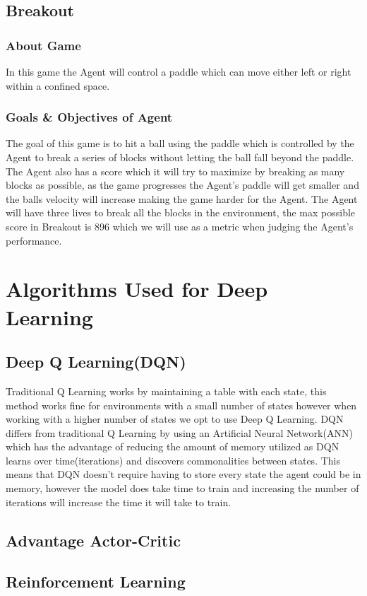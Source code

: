 \documentclass[conference]{IEEEtran}
\begin{document}
\subsection{Breakout}
\subsubsection{About Game}
In this game the Agent will control a paddle which can move either left or right within a confined space.
\subsubsection{Goals \& Objectives of Agent}
The goal of this game is to hit a ball using the paddle which is controlled by the Agent to break a series of blocks without letting the ball fall beyond the paddle.  The Agent also has a score which it will try to maximize by breaking as many blocks as possible, as the game progresses the Agent's paddle will get smaller and the balls velocity will increase making the game harder for the Agent.  The Agent will have three lives to break all the blocks in the environment, the max possible score in Breakout is 896 which we will use as a metric when judging the Agent's performance.
\section{Algorithms Used for Deep Learning}
\subsection{Deep Q Learning(DQN)}
Traditional Q Learning works by maintaining a table with each state, this method works fine for environments with a small number of states however when working with a higher number of states we opt to use Deep Q Learning.  DQN differs from traditional Q Learning by using an Artificial Neural Network(ANN) which has the advantage of reducing the amount of memory utilized as DQN learns over time(iterations) and discovers commonalities between states.  This means that DQN doesn't require having to store every state the agent could be in memory, however the model does take time to train and increasing the number of iterations will increase the time it will take to train.
\subsection{Advantage Actor-Critic}
\subsection{Reinforcement Learning}
\end{document}
